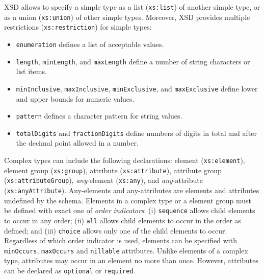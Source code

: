 XSD allows to specify a simple type as a list (\texttt{xs:list}) of another simple type, or as a union (\texttt{xs:union}) of other simple types.
Moreover, XSD provides multiple restrictions (\texttt{xs:restriction}) for simple types:
\begin{itemize}
    \item \texttt{enumeration} defines a list of acceptable values.
    \item \texttt{length}, \texttt{min\-Length}, and \texttt{max\-Length} define a number of string characters or list items.
    \item \texttt{min\-Inclu\-sive}, \texttt{max\-Inclu\-sive}, \texttt{min\-Exclu\-sive}, and \texttt{max\-Exclu\-sive} define lower and upper bounds for numeric values.
    \item \texttt{pattern} defines a character pattern for string values.
    \item \texttt{totalDigits} and \texttt{fractionDigits} define numbers of digits in total and after the decimal point allowed in a number.
\end{itemize}



Complex types can include the following declarations: element (\texttt{xs:element}), element group (\texttt{xs:group}), attribute (\texttt{xs:attribute}), attribute group (\texttt{xs:attri\-bute\-Group}), \emph{any}-element (\texttt{xs:any}), and \emph{any}-attribute (\texttt{xs:anyAttribute}).
Any-elements and any-attributes are elements and attributes undefined by the schema.
Elements in a complex type or a element group must be defined with exact one of \emph{order indicators}:
(i) \texttt{sequence} allows child elements to occur in any order;
(ii) \texttt{all} allows child elements to occur in the order as defined;
and (iii) \texttt{choice} allows only one of the child elements to occur.
Regardless of which order indicator is used, elements can be specified with \texttt{min\-Occurs}, \texttt{max\-Occurs} and \texttt{nillable} attributes.
Unlike elements of a complex type, attributes may occur in an element no more than once.
However, attributes can be declared as \texttt{optional} or \texttt{required}.


\bigskip{}







